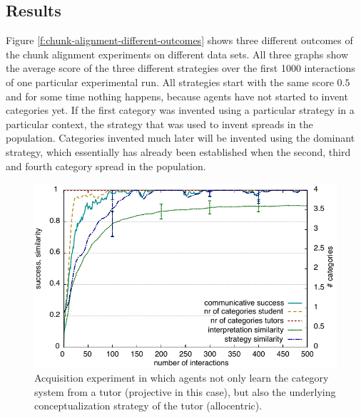 \subsection{Results}
Figure \ref{f:chunk-alignment-different-outcomes} shows three different outcomes 
of the chunk alignment experiments on different data sets. All three graphs show
the average score of the three different strategies over the first 1000 interactions 
of one particular experimental run. All strategies start with 
the same score $0.5$ and for some time nothing happens, because agents 
have not started to invent categories yet. If the first category was invented 
using a particular strategy in a particular context, the strategy that was used 
to invent spreads in the population. Categories invented much later will be 
invented using the dominant strategy, which essentially 
has already been established when the second, third and fourth category 
spread in the population.


\begin{figure}
\begin{centering}
\includegraphics[width=0.9\columnwidth]{figs/chunk-alignment-chunks-acquisition}
\caption[Results strategy acquisition experiments]{%
Acquisition experiment in which agents not only learn the 
category system from a tutor (projective in this case), but also 
the underlying conceptualization strategy of the tutor (allocentric).}
\label{f:chunk-alignment-acquisition}
\end{centering}
\end{figure}

